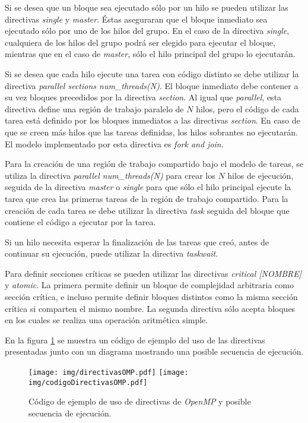 Si se desea que un bloque sea ejecutado sólo por un hilo se pueden utilizar las
directivas \emph{single} y \emph{master}. Éstas aseguraran que el bloque
inmediato sea ejecutado sólo por uno de los hilos del grupo. En el caso de la
directiva \emph{single}, cualquiera de los hilos del grupo podrá ser elegido
para ejecutar el bloque, mientras que en el caso de \emph{master}, sólo el
hilo principal del grupo lo ejecutarán.

Si se desea que cada hilo ejecute una tarea con código distinto se debe utilizar
la directiva \emph{parallel sections num\_threads(N)}. El bloque inmediato debe
contener a su vez bloques precedidos por la directiva \emph{section}. Al igual
que \emph{parallel}, esta directiva define una región de trabajo paralelo de $N$
hilos, pero el código de cada tarea está definido por los bloques inmediatos a
las directivas \emph{section}. En caso de que se creen más hilos que las tareas
definidas, los hilos sobrantes no ejecutarán. El modelo implementado por esta
directiva es \emph{fork and join}.

Para la creación de una región de trabajo compartido bajo el modelo de tareas, se
utiliza la directiva \emph{parallel num\_threads(N)} para crear los $N$ hilos de
ejecución, seguida de la directiva \emph{master} o \emph{single} para que sólo
el hilo principal ejecute la tarea que crea las primeras tareas de la región de
trabajo compartido. Para la creación de cada tarea se debe utilizar la directiva
\emph{task} seguida del bloque que contiene el código a ejecutar por la tarea.

Si un hilo necesita esperar la finalización de las tareas que creó, antes de
continuar su ejecución, puede utilizar la directiva \emph{taskwait}.

Para definir secciones críticas se pueden utilizar las directivas \emph{critical
[NOMBRE]} y \emph{atomic}. La primera permite definir un bloque de complejidad
arbitraria como sección crítica, e incluso permite definir bloques distintos
como la misma sección crítica si comparten el mismo nombre. La segunda directiva
sólo acepta bloques en los cuales se realiza una operación aritmética simple.

En la figura \ref{directivas} se muestra un código de ejemplo del uso de las
directivas presentadas junto con un diagrama mostrando una posible secuencia
de ejecución.

\begin{figure}[h]

	\centering

	\texttt{[image: img/directivasOMP.pdf]}
	\texttt{[image: img/codigoDirectivasOMP.pdf]}

	\caption{Código de ejemplo de uso de directivas de \emph{OpenMP} y
	posible secuencia de ejecución.}

	\label{directivas}

\end{figure}
